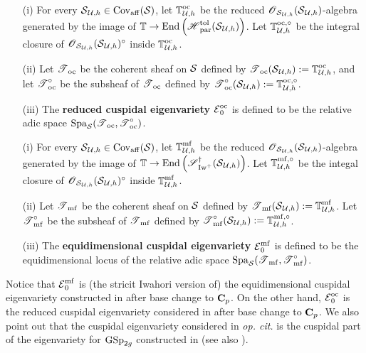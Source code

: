 \begin{Definition}
\begin{enumerate}
\item[(i)] For every $\calS_{\calU, h}\in \Cov_{\mathrm{aff}}(\calS)$, let $\bbT_{\calU, h}^{\oc}$ be the reduced $\scrO_{\calS_{\calU, h}}(\calS_{\calU, h})$-algebra generated by the image of $\bbT\rightarrow \End\left(\scrH_{\Par}^{\tol}(\calS_{\calU, h})\right)$. Let $\bbT_{\calU, h}^{\oc, \circ}$ be the integral closure of $\scrO_{\calS_{\calU, h}}(\calS_{\calU, h})^{\circ}$ inside $\bbT_{\calU, h}^{\oc}$. 
\item[(ii)] Let $\scrT_{\oc}$ be the coherent sheaf on $\calS$ defined by $\scrT_{\oc}(\calS_{\calU, h}):=\bbT_{\calU, h}^{\oc}$, and let $\scrT_{\oc}^{\circ}$ be the subsheaf of $\scrT_{\oc}$ defined by $\scrT_{\oc}^{\circ}(\calS_{\calU, h}):=\bbT_{\calU, h}^{\oc, \circ}$.
\item[(iii)] The \textbf{reduced cuspidal eigenvariety} $\calE_{0}^{\oc}$ is defined to be the relative adic space $\Spa_{\calS}(\scrT_{\oc}, \scrT_{\oc}^{\circ})$. 
\end{enumerate}
\end{Definition}

\begin{Definition}
\begin{enumerate}
\item[(i)] For every $\calS_{\calU, h}\in \Cov_{\mathrm{aff}}(\calS)$, let $\bbT_{\calU, h}^{\mf}$ be the reduced $\scrO_{\calS_{\calU, h}}(\calS_{\calU, h})$-algebra generated by the image of $\bbT\rightarrow \End\left(\scrS_{\Iw^+}^{\dagger}(\calS_{\calU, h})\right)$. Let $\bbT_{\calU, h}^{\mf,\circ}$ be the integal closure of $\scrO_{\calS_{\calU, h}}(\calS_{\calU, h})^{\circ}$ inside $\bbT_{\calU, h}^{\mf}$.
\item[(ii)] Let $\scrT_{\mf}$ be the coherent sheaf on $\calS$ defined by $\scrT_{\mf}(\calS_{\calU, h}):=\bbT_{\calU, h}^{\mf}$. Let $\scrT_{\mf}^{\circ}$ be the subsheaf of $\scrT_{\mf}$ defined by $\scrT_{\mf}^{\circ}(\calS_{\calU, h}):=\bbT_{\calU, h}^{\mf, \circ}$. 
\item[(iii)] The \textbf{equidimensional cuspidal eigenvariety} $\calE_0^{\mf}$ is defined to be the equidimensional locus of the  relative adic space $\Spa_{\calS}(\scrT_{\mf}, \scrT_{\mf}^{\circ})$.
\end{enumerate}
\end{Definition}

\begin{Remark}\label{Remark: eigenvarieties}
\normalfont Notice that $\calE_0^{\mf}$ is (the stricit Iwahori version of) the equidimensional cuspidal eigenvariety constructed in \cite{AIP-2015} after base change to $\C_p$. On the other hand, $\calE_{0}^{\oc}$ is the reduced cuspidal eigenvariety considered in \cite{Wu-2020} after base change to $\C_p$. We also point out that the cuspidal eigenvariety considered in \textit{op. cit.} is the cuspidal part of the eigenvariety for $\GSp_{2g}$ constructed in \cite{Johansson-Newton} (see also \cite{Hansen-PhD}).
\end{Remark}

